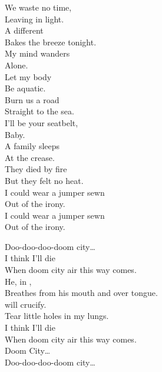 We waste no time, \\
Leaving in light. \\
A different  \\
Bakes the breeze tonight. \\

My mind wanders \\
Alone. \\
Let my body \\
Be aquatic. \\

Burn us a road \\
Straight to the sea. \\
I'll be your seatbelt, \\
Baby. \\

A family sleeps \\
At the crease. \\
They died by fire \\
But they felt no heat. \\
I could wear a jumper sewn \\
Out of the irony. \\

I could wear a jumper sewn \\
Out of the irony. \\





Doo-doo-doo-doom city… \\

I think I'll die \\
When doom city air this way comes. \\
He, in , \\
Breathes from his mouth and over tongue. \\
 will crucify. \\
Tear little holes in my lungs. \\
I think I'll die \\
When doom city air this way comes. \\

Doom City… \\

Doo-doo-doo-doom city… \\

